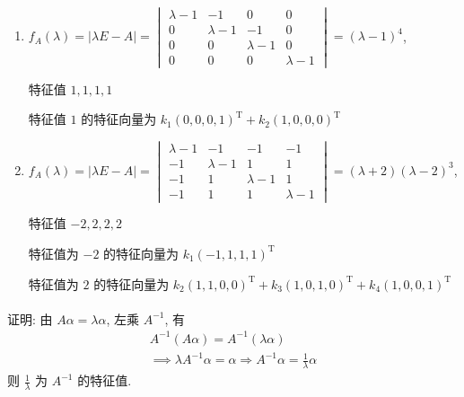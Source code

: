      \paragraph{} %
         \begin{enumerate}
             \item %
                   \( f_{A}(\lambda) = |\lambda E - A| = \begin{vmatrix}
                       \lambda - 1 & -1          & 0           & 0           \\
                       0           & \lambda - 1 & -1          & 0           \\
                       0           & 0           & \lambda - 1 & 0           \\
                       0           & 0           & 0           & \lambda - 1
                   \end{vmatrix} = (\lambda - 1)^{4} \),

                   特征值 \( 1, 1, 1, 1 \)

                   特征值 \( 1 \) 的特征向量为 \( k_{1}(0, 0, 0, 1)^{\mathrm{T}} + k_{2}(1, 0, 0, 0)^{\mathrm{T}} \)
             \item %
                   \( f_{A}(\lambda) = |\lambda E - A| = \begin{vmatrix}
                       \lambda - 1 & -1          & -1          & -1        \\
                       -1          & \lambda - 1 & 1           & 1         \\
                       -1          & 1           & \lambda - 1 & 1         \\
                       -1          & 1           & 1           & \lambda-1
                   \end{vmatrix} = (\lambda + 2)(\lambda - 2)^{3} \),

                   特征值 \( -2, 2, 2, 2 \)

                   特征值为 \( -2 \) 的特征向量为 \( k_{1}(-1, 1, 1, 1)^{\mathrm{T}} \)

                   特征值为 \( 2 \) 的特征向量为 \( k_{2}(1, 1, 0, 0)^{\mathrm{T}} + k_{3}(1, 0, 1, 0)^{\mathrm{T}} + k_{4}(1, 0, 0, 1)^{\mathrm{T}} \)
         \end{enumerate}


     \paragraph{} %
         证明: 由 \( A\alpha = \lambda\alpha \), 左乘 \( A^{-1} \), 有
         \begin{gather*}
             A^{-1}(A\alpha) = A^{-1}(\lambda\alpha) \\
             \implies \lambda A^{-1}\alpha = \alpha \Rightarrow A^{-1}\alpha = \frac{1}{\lambda}\alpha
         \end{gather*}
         则 \( \frac{1}{\lambda} \) 为 \( A^{-1} \) 的特征值.



